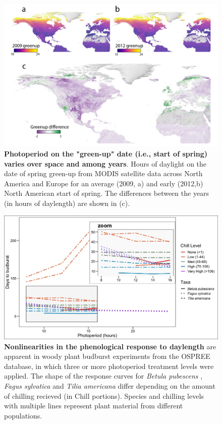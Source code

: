 \documentclass{article}
\begin{document}
 \begin{figure}[p]
\centering
\includegraphics{..//..//docs/photoperiod/figures/Greenup_corr.pdf} %
\caption{\textbf{Photoperiod on the "green-up" date (i.e., start of spring) varies over space and among years}. Hours of daylight on the date of spring green-up from MODIS satellite data across North America and Europe for an average (2009, a) and  early (2012,b) North American start of spring. The differences between the years (in hours of daylength) are shown in (c). }
 \label{fig:greenup}%
 \end{figure}
 
\begin{figure}[p]
\includegraphics{..//..//analyses/photoperiod/figures/Photo_curv_FINAL.jpeg} 
\caption{\textbf{Nonlinearities in the phenological response to daylength} are apparent in woody plant budburst experiments from the OSPREE database, in which three or more photoperiod treatment levels were applied. The shape of the response curves for \textit{Betula pubescens} \citep{Caffarra:2011b}, \textit{Fagus sylvatica} \citep{Heide:1993a} and \textit{Tilia americana} \citep{Ashby:1962aa} differ depending on the amount of chilling recieved (in Chill portions). Species and chilling levels with multiple lines represent plant material from different populations.}
 \label{fig:photocurve}
 \end{figure}
\end{document}
